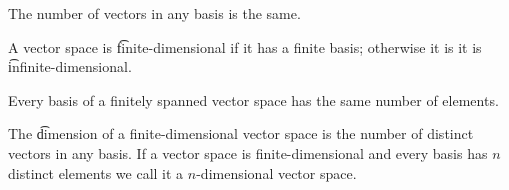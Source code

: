 

The number of vectors in any basis is the same.


A vector space is \t{finite-dimensional} if it has a finite basis; otherwise it is it is \t{infinite-dimensional}.

\begin{prop}
  Every basis of a finitely spanned vector space has the same number of elements.
\end{prop}

The \t{dimension} of a finite-dimensional vector space is the number of distinct vectors in any basis.
If a vector space is finite-dimensional and every basis has $n$ distinct elements we call it a \t{$n$-dimensional vector space}.
